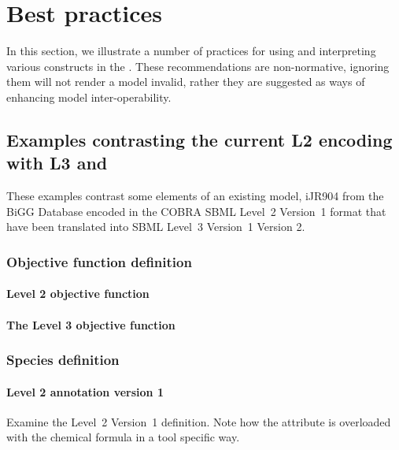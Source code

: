 
\section{Best practices}
\label{best-practices}

In this section, we illustrate a number of practices for using and
interpreting various constructs in the \FBCPackage.
These recommendations are non-normative, ignoring them will not render a model invalid, rather they are suggested as ways of enhancing model inter-operability. 

\subsection{Examples contrasting the current \SBML L2 encoding with L3 and \FBC}
\label{best-practices-cobraV2}
These examples contrast some elements of an existing model, iJR904 from the \textsf{BiGG} Database encoded in the \textsf{COBRA} SBML Level~2 Version~1 format \citep{ijr904, bigg, cobra} that have been translated into SBML Level~3 Version~1 \FBC Version 2.

\subsubsection*{Objective function definition}
\paragraph{\SBML Level 2 objective function}

\paragraph{The \SBML Level 3 objective function}
\protect{}

\subsubsection*{Species definition}
\paragraph{\SBML Level 2 \Species annotation version 1}
Examine the \SBML Level~2 Version~1 \Species definition. Note how the  attribute is overloaded with the chemical formula in a tool specific way.
%

